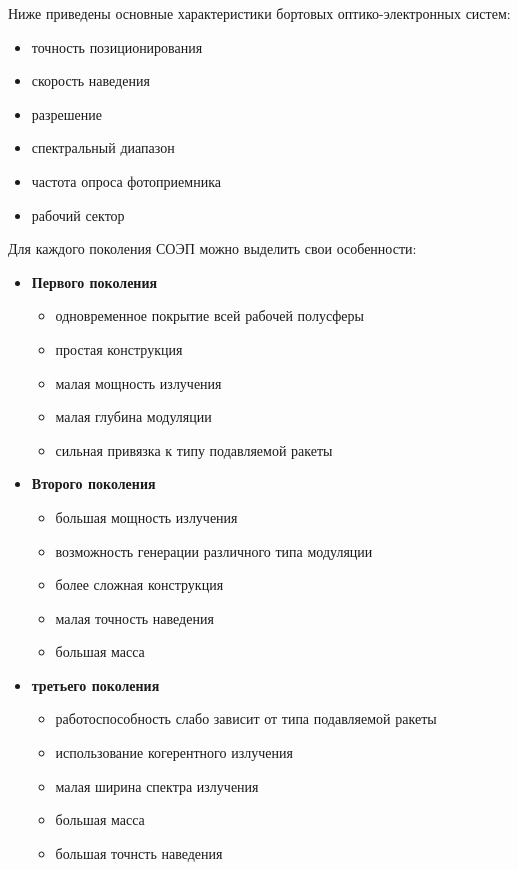 Ниже приведены основные характеристики бортовых оптико-электронных систем: 
\begin{itemize}
\item точность позиционирования  
\item скорость наведения
\item разрешение 
\item спектральный диапазон
\item частота опроса фотоприемника
\item рабочий сектор
\end{itemize}

Для каждого поколения СОЭП можно выделить свои особенности:
\begin{itemize}
	\item \textbf{Первого поколения}
	\begin{itemize}
		\item одновременное покрытие всей рабочей полусферы 
		\item простая конструкция
		\item малая мощность излучения
		\item малая глубина модуляции
		\item сильная привязка к типу подавляемой ракеты
	\end{itemize}
	\item \textbf{Второго поколения}
	\begin{itemize}
		\item большая мощность излучения
		\item возможность генерации различного типа модуляции
		\item более сложная конструкция
		\item малая точность наведения
		\item большая масса
	\end{itemize}
	\item \textbf{третьего поколения}
	\begin{itemize}
		\item работоспособность слабо зависит от типа подавляемой ракеты
		\item использование когерентного излучения
		\item малая ширина спектра излучения
		\item большая масса
		\item большая точнсть наведения
	\end{itemize}
\end{itemize}

